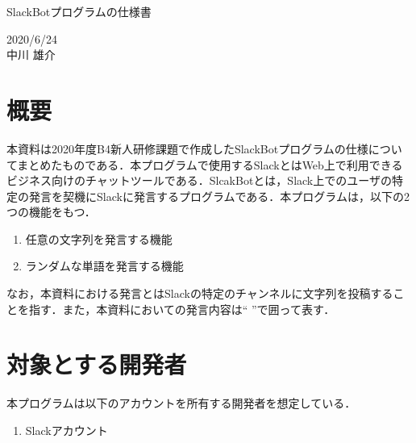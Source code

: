 \documentclass[12pt]{jsarticle}
\begin{document}
\begin{center}
{\LARGE SlackBotプログラムの仕様書}
\end{center}

\begin{flushright}
  2020/6/24\\
  中川 雄介
\end{flushright}
\section{概要}
\label{sec:introduction}
本資料は2020年度B4新人研修課題で作成したSlackBotプログラムの仕様についてまとめたものである．本プログラムで使用するSlackとはWeb上で利用できるビジネス向けのチャットツールである．SlcakBotとは，Slack上でのユーザの特定の発言を契機にSlackに発言するプログラムである．本プログラムは，以下の2つの機能をもつ．
\begin{enumerate}
\item 任意の文字列を発言する機能
\item ランダムな単語を発言する機能
\end{enumerate}
なお，本資料における発言とはSlackの特定のチャンネルに文字列を投稿することを指す．また，本資料においての発言内容は`` ''で囲って表す．


\section{対象とする開発者}\label{sec:user}
本プログラムは以下のアカウントを所有する開発者を想定している．
\begin{enumerate}
\item Slackアカウント
\end{enumerate}
\end{document}
